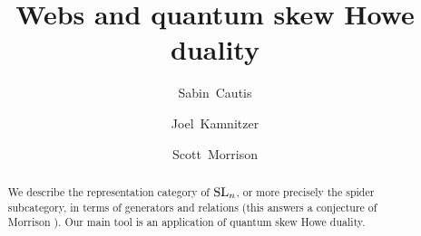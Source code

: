 \documentclass[11pt]{amsart}
\title{Webs and quantum skew Howe duality}
\author{Sabin~Cautis}
\author{Joel~Kamnitzer}
\author{Scott~Morrison}
\begin{document}
\makeatletter
{}
\gdef\theequation{\thesection.\arabic{equation}}
\makeatother

\begin{abstract}
We describe the representation category of ${\rm{SL}}_n$, or more precisely the spider subcategory, in terms of generators and relations (this answers a conjecture of Morrison \cite{0704.1503}). Our main tool is an application of quantum skew Howe duality. 
\end{abstract}


\maketitle


\tableofcontents


\def\Foam{{\mathcal{F}{\rm oam}}}
\newcommand{\alt}{\wedge}
\newcommand{\Alt}[2]{{\textstyle\bigwedge^{#1}_{#2}}}
\newcommand{\Usl}[1]{U\sl_{#1}}
\newcommand{\one}{1}
\def\sA{\mathcal{A}}
\def\l{\lambda}
\def\bZ{{\mathbb{Z}}}
\def\sl{{\mathfrak{sl}}}
\def\Sp{{\mathcal{S}p}}
\def\FSp{{\mathcal{FS}p}}
\def\bC{{\mathbb{C}}}
\def\g{{\mathfrak{g}}}
\def\SL{{\rm{SL}}}
\def\GL{{\rm{GL}}}
\def\gl{{\mathfrak{gl}}}
\def\dU{\dot{{\mathcal{U}}}_q}
\def\Uq{\mathcal{U}_q}
\def\Rep{\mathcal{R}ep}
\def\la{\langle}
\def\ra{\rangle}
\def\dalg{\dot{{U}}_q}

\newcommand{\ul}[1]{{\underline{#1}}}

\newcommand{\Lad}{\mathcal{L}ad}

\newcommand{\ladderX}{1.5}
\newcommand{\ladderY}{1.5}
\newcommand{\ladderR}{0.6}
\newcommand{\laddercoordinates}[2]{
\foreach \x in {0,...,#1} {
	\foreach \y in {0,...,#2} {
		\coordinate (l\x\y) at (\x * \ladderX, \y * \ladderY);
		\coordinate (u\x\y) at ($(l\x\y)+\ladderR*(0,\ladderY)$);
		\coordinate (d\x\y) at ($(l\x\y)+(0,\ladderY)-\ladderR*(0,\ladderY)$);
	}
}
}
\newcommand{\ladderEn}[5]{
\draw[mid>] (l#1#2) -- (d#1#2);
\draw[mid>] (d#1#2) -- ($(l#1#2)+(0,\ladderY)$) node[left] {#3};
\draw[mid>] ($(l#1#2)+(\ladderX,0)$) -- ($(u#1#2)+(\ladderX,0)$);
\draw[mid>] ($(u#1#2)+(\ladderX,0)$) -- ($(l#1#2)+(\ladderX,\ladderY)$) node[right] {#4};
\draw[mid>] (d#1#2) --node[above]{#5} ($(u#1#2)+(\ladderX,0)$);
}
\newcommand{\ladderE}[4]{\ladderEn{#1}{#2}{#3}{#4}{}}
\newcommand{\ladderFn}[5]{
\draw[mid>] (l#1#2) -- (u#1#2);
\draw[mid>] (u#1#2) -- ($(l#1#2)+(0,\ladderY)$) node[left] {#3};
\draw[mid>] ($(l#1#2)+(\ladderX,0)$) -- ($(d#1#2)+(\ladderX,0)$);
\draw[mid>] ($(d#1#2)+(\ladderX,0)$) -- ($(l#1#2)+(\ladderX,\ladderY)$) node[right] {#4};
\draw[mid>] ($(d#1#2)+(\ladderX,0)$) --node[above]{#5} (u#1#2);
}
\newcommand{\ladderF}[4]{\ladderFn{#1}{#2}{#3}{#4}{}}
\newcommand{\ladderIn}[3]{\draw[mid>] (l#1#2) -- +($#3*(0,\ladderY)$);}
\newcommand{\ladderI}[2]{\ladderIn{#1}{#2}{1}}
\end{document}
